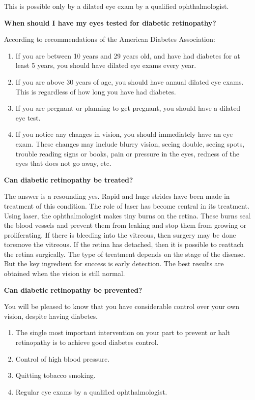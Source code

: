 This is possible only by a dilated eye exam by a qualified ophtha\-lmologist.

\noindent\textbf{When should I have my eyes tested for diabetic retinopathy?}

\noindent According to recommendations of the American Diabetes Association:

\begin{enumerate}[•]
\itemsep=0pt
\item If you are between 10 years and 29 years old, and have had diabetes for at least 5 years, you should have dilated eye exams every year.
\item If you are above 30 years of age, you should have annual dilated eye exams. This is regardless of how long you have had diabetes.
\item If you are pregnant or planning to get pregnant, you should have a dilated eye test.
\item If you notice any changes in vision, you should immediately have an eye exam. These changes may include blurry vision, seeing double, seeing spots, trouble reading signs or books, pain or pressure in the eyes, redness of the eyes that does not go away, etc.
\end{enumerate}

\noindent\textbf{Can diabetic retinopathy be treated?}

The answer is a resounding yes. Rapid and huge strides have been made in treatment of this condition. The role of laser has become central in its treatment. Using laser, the ophthalmologist makes tiny burns on the retina. These burns seal the blood vessels and prevent them from leaking and stop them from growing or proliferating. If there is bleeding into the vitreous, then surgery may be done to\break remove the vitreous. If the retina has detached, then it is possible to reattach the retina surgically. The type of treatment depends on the stage of the disease. But the key ingredient for success is early dete\-ction. The best results are obtained when the vision is still normal.

\noindent\textbf{Can diabetic retinopathy be prevented?}

You will be pleased to know that you have considerable control over your own vision, despite having diabetes.

\begin{enumerate}[•]
\itemsep=0pt
\item The single most important intervention on your part to prevent or halt retinopathy is to achieve good diabetes control.
\item Control of high blood pressure.
\item Quitting tobacco smoking.
\item Regular eye exams by a qualified ophthalmologist.
\end{enumerate}

